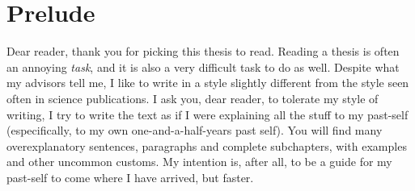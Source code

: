 \chapter*{Prelude}\label{prelude}

Dear reader, thank you for picking this thesis to read. Reading a thesis is often an
annoying \emph{task}, and it is also a very difficult task to do as well. Despite what my
advisors tell me, I like to write in a style slightly different from the style seen often
in science publications. I ask you, dear reader, to tolerate my style of writing, I try to
write the text as if I were explaining all the stuff to my past-self (especifically, to my
own one-and-a-half-years past self). You will find many overexplanatory sentences,
paragraphs and complete subchapters, with examples and other uncommon customs. My
intention is, after all, to be a guide for my past-self to come where I have arrived, but
faster.

